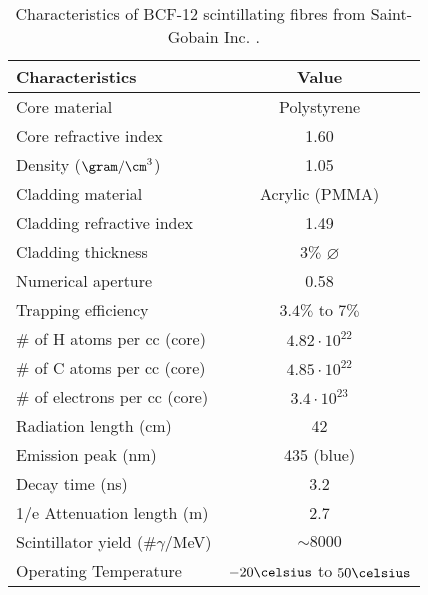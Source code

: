 \begin{table}[t]
\centering{}%
\begin{tabular}{lc}
\toprule 
Characteristics & Value \tabularnewline
\midrule
\midrule 
Core material & Polystyrene \tabularnewline
Core refractive index & 1.60 \tabularnewline
Density ($\gram/\cm^3$) & 1.05 \tabularnewline
Cladding material & Acrylic (PMMA) \tabularnewline
Cladding refractive index & 1.49 \tabularnewline
Cladding thickness & $3\%$  $\varnothing$ \tabularnewline
Numerical aperture & 0.58 \tabularnewline
Trapping efficiency & $3.4\%$ to $7\%$ \tabularnewline
$\#$ of H atoms per cc (core) & $4.82 \cdot{} 10^{22}$ \tabularnewline
$\#$ of C atoms per cc (core) & $4.85 \cdot{} 10^{22}$ \tabularnewline
$\#$ of electrons per cc (core) & $3.4 \cdot{} 10^{23}$ \tabularnewline
Radiation length (cm) & 42 \tabularnewline
Emission peak (nm) & 435 (blue) \tabularnewline
Decay time (ns) & 3.2 \tabularnewline
1/e Attenuation length (m) & 2.7 \tabularnewline
Scintillator yield (\#$\gamma$/MeV) & $\sim 8000$ \tabularnewline
Operating Temperature & $-20\celsius$ to $50\celsius$ \tabularnewline
\bottomrule
\end{tabular}
\caption{Characteristics of BCF-12 scintillating fibres from Saint-Gobain Inc. \cite{DataSheetBCF12Fiber}.}
\label{tab:ParametersFibersBCF12}
\end{table}